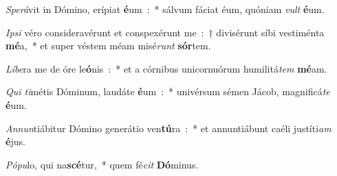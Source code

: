 \documentclass[letterpaper,12pt]{article} %
\begin{document}
\bigskip{}
\vspace{-0.9\baselineskip}
\begin{psalmverses}[8]
\item \emph{Sperá}vit in Dómino, erípiat \textbf{é}um~:~* sálvum fáciat éum, quóniam \emph{vult} \textbf{é}um.
\item \emph{Ipsi} véro consideravérunt et conspexérunt me~:~† divisérunt síbi vestiménta \textbf{mé}a,~* et super véstem méam misé\emph{runt} \textbf{sór}tem.
\item \emph{Líbe}ra me de óre le\textbf{ó}nis~:~* et a córnibus unicornuórum humilitá\emph{tem} \textbf{mé}am.
\item \emph{Qui ti}métis Dóminum, laudáte \textbf{é}um~:~* univérsum sémen Jácob, magnificá\emph{te} \textbf{é}um.
\item \emph{Annun}tiábitur Dómino generátio ven\textbf{tú}ra~:~* et annuntiábunt caéli justíti\emph{am} \textbf{é}jus.
\item \emph{Pópu}lo, qui na\textbf{scé}tur,~* quem fé\emph{cit} \textbf{Dó}minus.
\end{psalmverses}
\end{document}
